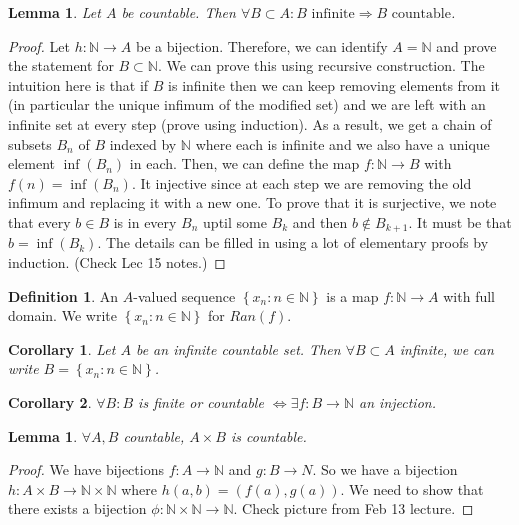 \documentclass{article}
\newcommand\N{\ensuremath{\mathbb{N}}}
\newtheorem{corollary}{Corollary}[theorem]
\newtheorem{lemma}[theorem]{Lemma}
\theoremstyle{definition}
\newtheorem{definition}{Definition}[subsection]
\theoremstyle{remark}
\theoremstyle{plain}
\begin{document}
\begin{lemma}
    Let \(A\) be countable. Then \(\forall B \subset A: B \text{ infinite} \Rightarrow B \text{ countable}\).
\end{lemma}

\begin{proof}
    Let \(h: \N \to A\) be a bijection. Therefore, we can identify \(A = \N\) and prove the statement for \(B \subset \N\).
    We can prove this using recursive construction. The intuition here is that if \(B\) is infinite then we can keep removing elements from it 
    (in particular the unique infimum of the modified set) and we are left with an infinite set at every step (prove using induction). As a result, we get a chain of subsets \(B_n\) of \(B\) indexed by \(\N\) where
    each is infinite and we also have a unique element \(\inf(B_n)\) in each. Then, we can define the map \(f: \N \to B\) with \(f(n) = \inf(B_n)\). It injective 
    since at each step we are removing the old infimum and replacing it with a new one. To prove that it is surjective, we note that every \(b \in B\) is in every \(B_n\) uptil some \(B_k\) and then
    \(b \notin B_{k+1}\). It must be that \(b = \inf(B_k)\). The details can be filled in using a lot of elementary proofs by induction. (Check Lec 15 notes.)
\end{proof}
    
\begin{definition}
    An \(A\)-valued sequence \(\left\{ x_n : n \in \N \right\}\) is a map \(f: \N \to A\) with full domain. We write 
    \(\left\{ x_n: n \in \N \right\}\) for \(Ran(f)\).
\end{definition}

\begin{corollary}
    Let \(A\) be an infinite countable set. Then \(\forall B \subset A\) infinite, we can write \(B = \left\{ x_n: n \in \N \right\}\).
\end{corollary}

\begin{corollary}
    \(\forall B: B\) is finite or countable \(\iff \exists f: B \to \N\) an injection.
\end{corollary}

\begin{lemma}
    \(\forall A,B\) countable, \(A\times B\) is countable. 
\end{lemma}
\begin{proof}
    We have bijections \(f: A \to \N\) and \(g: B \to N\). So we have a bijection \(h: A\times B \to \N \times \N\) where \(h(a,b) = (f(a), g(a))\). We need to show that there exists 
    a bijection \(\phi: \N \times \N \to \N\). Check picture from Feb 13 lecture.
\end{proof}
\end{document}
